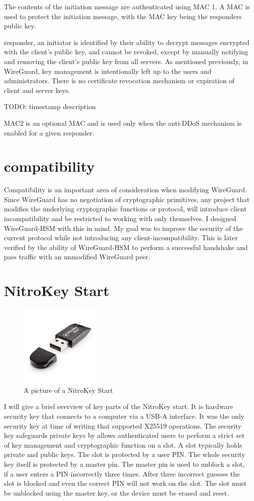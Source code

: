 \documentclass [11pt, proquest] {uwthesis}[2020/02/24]
\begin{document}
The contents of the initiation message are authenticated using MAC 1.
A MAC is used to protect the initiation message, with the MAC key being the responders public key.

responder, an initiator is identified by their ability to decrypt messages encrypted with the client's public key, and cannot be revoked, except by manually notifying and removing the client’s public key from all servers. As mentioned previously, in WireGuard, key management is intentionally left up to the users and administrators. There is no certificate revocation mechanism or expiration of client and server keys.

TODO: timestamp description

MAC2 is an optional MAC and is used only when the anti-DDoS mechanism is enabled for a given responder. 

\section{compatibility}
Compatibility is an important area of consideration when modifying WireGuard. Since WireGuard has no negotiation of cryptographic primitives, any project that modifies the underlying cryptographic functions or protocol, will introduce client incompatibility and be restricted to working with only themselves. I designed WireGuard-HSM with this in mind. My goal was to improve the security of the current protocol while not introducing any client-incompatibility. This is later verified by the ability of WireGuard-HSM to perform a successful handshake and pass traffic with an unmodified WireGuard peer.

\section{NitroKey Start}
\begin{figure}[ht]
\includegraphics[width=4cm]{paper/images/nitrokey.jpg}
\caption{A picture of a NitroKey Start}
\label{nitrokey}
\end{figure}
I will give a brief overview of key parts of the NitroKey start. It is hardware security key that connects to a computer via a USB-A interface. It was the only security key at time of writing that supported X25519 operations.
The security key safeguards private keys by allows authenticated users to perform a strict set of key management and cryptographic function on a slot. A slot typically holds private and public keys. The slot is protected by a user PIN. The whole security key itself is protected by a master pin. The master pin is used to unblock a slot, if a user enters a PIN incorrectly three times. After three incorrect guesses the slot is blocked and even the correct PIN will not work on the slot. The slot must be unblocked using the master key, or the device must be erased and reset.
\end{document}
